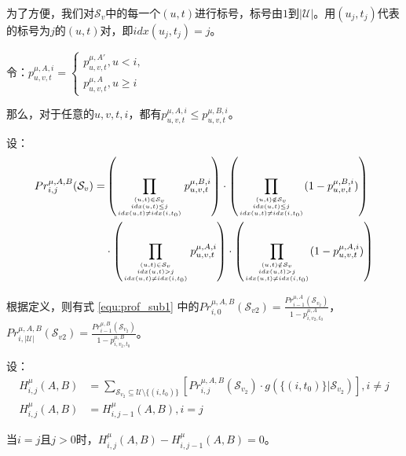 为了方便，我们对$\mathcal{S}_v$中的每一个$(u,t)$进行标号，标号由$1$到$|\mathcal{U}|。$用$(u_j,t_j)$代表的标号为$j$的$(u,t)$对，即$idx(u_j,t_j)=j$。

令：$p_{u,v,t}^{\mu,A,i}=\begin{cases}p_{u,v,t}^{\mu,A'}, u<i,\\p_{u,v,t}^{\mu,A},u\ge i \end{cases}$

那么，对于任意的$u,v,t,i$，都有$p_{u,v,t}^{\mu,A,i} \le p_{u,v,t}^{\mu,B,i}$。

设：
\begin{align}
\footnotesize
    Pr_{i,j}^{\mu,A,B}(\mathcal{S}_v)=&\left(\prod_{{(u,t)\in \mathcal{S}_v \atop idx(u,t)\le j } \atop{ idx(u,t) \ne idx(i,t_0)}}p_{u,v,t}^{\mu,B,i}\right)\cdot \left(\prod_{{(u,t) \notin \mathcal{S}_v \atop idx(u,t)\le j} \atop{ idx(u,t) \ne idx(i,t_0)}} (1-p_{u,v,t}^{\mu,B,i})\right) \nonumber \\
    &\cdot \left(\prod_{{(u,t)\in \mathcal{S}_v \atop idx(u,t)> j} \atop {idx(u,t)\ne idx(i,t_0)}}p_{u,v,t}^{\mu,A,i}\right)\cdot \left(\prod_{{(u,t) \notin \mathcal{S}_v \atop idx(u,t)> j} \atop{ idx(u,t)\ne idx(i,t_0)}} (1-p_{u,v,t}^{\mu,A,i})\right)
\end{align}

根据定义，则有式 \ref{equ:prof_sub1} 中的$Pr_{i,0}^{\mu,A,B}(\mathcal{S}_{v2})=\frac{Pr_{i-1}^{\mu,A}(\mathcal{S}_{v_2})}{1-p_{i,v_2,t_0}^{\mu,A}}$，$Pr_{i,|\mathcal{U}|}^{\mu,A,B}(\mathcal{S}_{v2})=\frac{Pr_{i-1}^{\mu,B}(\mathcal{S}_{v_2})}{1-p_{i,v_2,t_0}^{\mu,B}}$。

设：
\begin{align}
    H_{i,j}^{\mu}(A,B)&= \sum_{\mathcal{S}_{v_2}\subseteq \mathcal{U} \setminus \{(i,t_0)\}}\left[Pr_{i,j}^{\mu,A,B}(\mathcal{S}_{v_2}) \cdot g(\{(i,t_0)\} |\mathcal{S}_{v_2})\right],i\ne j 
    \\H_{i,j}^{\mu}(A,B)&=H_{i,j-1}^{\mu}(A,B),i=j
\end{align}

当$i=j$且$j>0$时，$H_{i,j}^{\mu}(A,B)-H_{i,j-1}^{\mu}(A,B)=0$。

